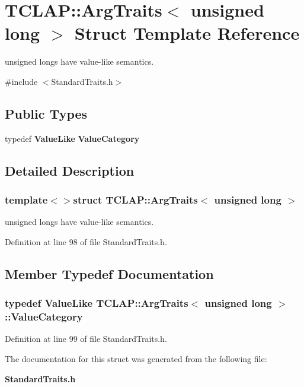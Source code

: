 \section{T\+C\+L\+A\+P\+:\+:Arg\+Traits$<$ unsigned long $>$ Struct Template Reference}
\label{structTCLAP_1_1ArgTraits_3_01unsigned_01long_01_4}


unsigned longs have value-\/like semantics.  




{\ttfamily \#include $<$Standard\+Traits.\+h$>$}

\subsection*{Public Types}
\begin{DoxyCompactItemize}
\item 
typedef {\bf Value\+Like} {\bf Value\+Category}
\end{DoxyCompactItemize}


\subsection{Detailed Description}
\subsubsection*{template$<$$>$struct T\+C\+L\+A\+P\+::\+Arg\+Traits$<$ unsigned long $>$}

unsigned longs have value-\/like semantics. 

Definition at line 98 of file Standard\+Traits.\+h.



\subsection{Member Typedef Documentation}
\subsubsection[{Value\+Category}]{\setlength{\rightskip}{0pt plus 5cm}typedef {\bf Value\+Like} {\bf T\+C\+L\+A\+P\+::\+Arg\+Traits}$<$ unsigned long $>$\+::{\bf Value\+Category}}\label{structTCLAP_1_1ArgTraits_3_01unsigned_01long_01_4_aa6aeb6243e6fbf8b5aba659083baa1ac}


Definition at line 99 of file Standard\+Traits.\+h.



The documentation for this struct was generated from the following file\+:\begin{DoxyCompactItemize}
\item 
{\bf Standard\+Traits.\+h}\end{DoxyCompactItemize}
